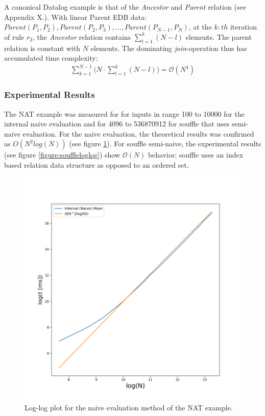 A canonical Datalog example is that of the \textit{Ancestor} and \textit{Parent} relation (see Appendix X.). With linear Parent EDB data: $Parent(P_1, P_2), Parent(P_2, P_3), \ldots, Parent(P_{N-1}, P_N)$, at the $k:th$ iteration of rule $r_2$, the \textit{Ancestor} relation contains $\sum_{l = 1}^{k} (N - l)$ elements. The parent relation is constant with $N$ elements. The dominating \textit{join}-operation thus has accumulated time complexity:
\begin{align*}
\sum_{k = 1}^{N - 1} \Big (N \cdot \sum_{l = 1}^{k} (N - l)\Big) = \mathcal{O}(N^4)
\end{align*}

\subsubsection{Experimental Results}
The NAT example was measured for for inputs in range 100 to 10000 for the internal naive evaluation and for 4096 to 536870912 for souffle that uses semi-naive evaluation. For the naive evaluation, the theoretical results was confirmed as $O(N^2 log(N))$ (see figure \ref{figure:internalloglog}). For souffle semi-naive, the experimental results (see figure \ref{figure:souffleloglog}) show $\mathcal{O}(N)$ behavior; souffle uses an index based relation data structure as opposed to an ordered set.

\begin{figure}[!ht]
\includegraphics[width=.9\linewidth, height=12\baselineskip]{img/internalloglog.png}
\caption{Log-log plot for the naive evaluation method of the NAT example.}
\label{figure:internalloglog}
\end{figure}


